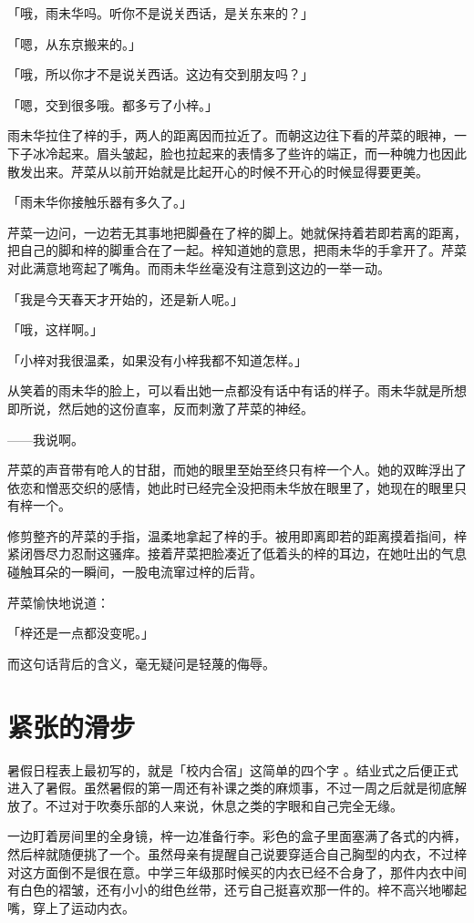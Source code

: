 \documentclass[UTF8]{ctexart}
\begin{document}
    「哦，雨未华吗。听你不是说关西话，是关东来的？」

    「嗯，从东京搬来的。」

    「哦，所以你才不是说关西话。这边有交到朋友吗？」

    「嗯，交到很多哦。都多亏了小梓。」

    雨未华拉住了梓的手，两人的距离因而拉近了。而朝这边往下看的芹菜的眼神，一下子冰冷起来。眉头皱起，脸也拉起来的表情多了些许的端正，而一种魄力也因此散发出来。芹菜从以前开始就是比起开心的时候不开心的时候显得要更美。

    「雨未华你接触乐器有多久了。」

    芹菜一边问，一边若无其事地把脚叠在了梓的脚上。她就保持着若即若离的距离，把自己的脚和梓的脚重合在了一起。梓知道她的意思，把雨未华的手拿开了。芹菜对此满意地弯起了嘴角。而雨未华丝毫没有注意到这边的一举一动。

    「我是今天春天才开始的，还是新人呢。」

    「哦，这样啊。」

    「小梓对我很温柔，如果没有小梓我都不知道怎样。」

    从笑着的雨未华的脸上，可以看出她一点都没有话中有话的样子。雨未华就是所想即所说，然后她的这份直率，反而刺激了芹菜的神经。

    ——我说啊。

    芹菜的声音带有呛人的甘甜，而她的眼里至始至终只有梓一个人。她的双眸浮出了依恋和憎恶交织的感情，她此时已经完全没把雨未华放在眼里了，她现在的眼里只有梓一个。

    修剪整齐的芹菜的手指，温柔地拿起了梓的手。被用即离即若的距离摸着指间，梓紧闭唇尽力忍耐这骚痒。接着芹菜把脸凑近了低着头的梓的耳边，在她吐出的气息碰触耳朵的一瞬间，一股电流窜过梓的后背。

    芹菜愉快地说道：

    「梓还是一点都没变呢。」

    而这句话背后的含义，毫无疑问是轻蔑的侮辱。
    \section{紧张的滑步}
    暑假日程表上最初写的，就是「校内合宿」这简单的四个字 。结业式之后便正式进入了暑假。虽然暑假的第一周还有补课之类的麻烦事，不过一周之后就是彻底解放了。不过对于吹奏乐部的人来说，休息之类的字眼和自己完全无缘。

    一边盯着房间里的全身镜，梓一边准备行李。彩色的盒子里面塞满了各式的内裤，然后梓就随便挑了一个。虽然母亲有提醒自己说要穿适合自己胸型的内衣，不过梓对这方面倒不是很在意。中学三年级那时候买的内衣已经不合身了，那件内衣中间有白色的褶皱，还有小小的绀色丝带，还亏自己挺喜欢那一件的。梓不高兴地嘟起嘴，穿上了运动内衣。
\end{document}
